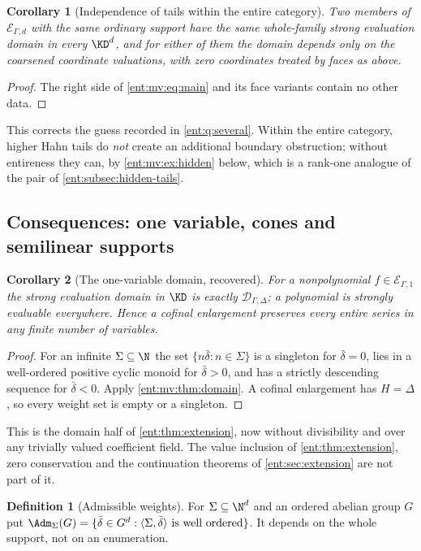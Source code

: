 \documentclass[11pt]{article}
\theoremstyle{plain}
\theoremstyle{plain}
\theoremstyle{plain}
\newtheorem{corollary}[corollary]{Corollary}
\theoremstyle{definition}
\newtheorem{definition}[definition]{Definition}
\theoremstyle{definition}
\theoremstyle{definition}
\theoremstyle{definition}
\theoremstyle{remark}
\newcommand{\Dom}{\mathcal D_{\Gamma,\Delta}}
\newcommand{\inner}[2]{\langle#1,#2\rangle}
\begin{document}
\begin{corollary}[Independence of tails within the entire category]
\label{ent:mv:cor:tails}
Two members of $\mathcal E_{\Gamma,d}$ with the same ordinary support have the
same whole-family strong evaluation domain in every $\KD^d$, and for either
of them the domain depends only on the coarsened coordinate valuations, with
zero coordinates treated by faces as above.
\end{corollary}
\begin{proof}
The right side of \eqref{ent:mv:eq:main} and its face variants contain no
other data.
\end{proof}

This corrects the guess recorded in \cref{ent:q:several}. Within the entire
category, higher Hahn tails do \emph{not} create an additional boundary
obstruction; without entireness they can, by \cref{ent:mv:ex:hidden} below,
which is a rank-one analogue of the pair of \cref{ent:subsec:hidden-tails}.

\subsection{Consequences: one variable, cones and semilinear supports}
\label{ent:mv:subsec:cones}

\begin{corollary}[The one-variable domain, recovered]\label{ent:mv:cor:onevar}
For a nonpolynomial $f\in\mathcal E_{\Gamma,1}$ the strong evaluation domain in
$\KD$ is exactly $\Dom$; a polynomial is strongly evaluable everywhere. Hence
a cofinal enlargement preserves every entire series in any finite number of
variables.
\end{corollary}
\begin{proof}
For an infinite $\Sigma\subseteq\N$ the set $\{n\bar\delta:n\in\Sigma\}$ is a
singleton for $\bar\delta=0$, lies in a well-ordered positive cyclic monoid
for $\bar\delta>0$, and has a strictly descending sequence for $\bar\delta<0$.
Apply \cref{ent:mv:thm:domain}. A cofinal enlargement has $H=\Delta$, so every
weight set is empty or a singleton.
\end{proof}

This is the domain half of \cref{ent:thm:extension}, now without
divisibility and over any trivially valued coefficient field. The value
inclusion of \cref{ent:thm:extension}, zero conservation and the continuation
theorems of \cref{ent:sec:extension} are not part of it.

\begin{definition}[Admissible weights]\label{ent:mv:def:adm}
For $\Sigma\subseteq\N^d$ and an ordered abelian group $G$ put
$\Adm_\Sigma(G)=\{\bar\delta\in G^d:\inner\Sigma{\bar\delta}\text{ is well
ordered}\}$. It depends on the whole support, not on an enumeration.
\end{definition}
\end{document}
